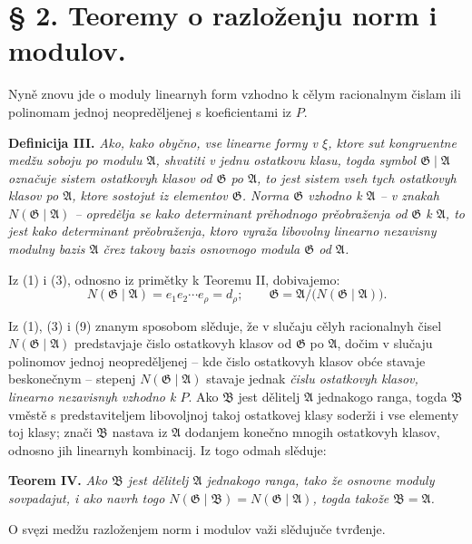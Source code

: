 \documentclass[11pt]{article}
\providecommand{\Amod}{\mathfrak A}
\providecommand{\Bmod}{\mathfrak B}
\providecommand{\Gmod}{\mathfrak G}
\providecommand{\Norm}{N}
\begin{document}
\section*{§ 2. Teoremy o razloženju norm i modulov.}

Nyně znovu jde o moduly linearnyh form vzhodno k cělym racionalnym čislam ili polinomam jednoj neopreděljenej s koeficientami iz $P$.

\medskip
\noindent\textbf{Definicija III.} \emph{Ako, kako obyčno, vse linearne formy v $\xi$, ktore sut kongruentne medžu soboju po modulu $\Amod$, shvatiti v jednu ostatkovu klasu, togda symbol $\Gmod\mid\Amod$ označuje sistem ostatkovyh klasov od $\Gmod$ po $\Amod$, to jest sistem vseh tych ostatkovyh klasov po $\Amod$, ktore sostojut iz elementov $\Gmod$. Norma $\Gmod$ vzhodno k $\Amod$ -- v znakah $\Norm(\Gmod\mid\Amod)$ -- opredělja se kako determinant prěhodnogo prěobraženja od $\Gmod$ k $\Amod$, to jest kako determinant prěobraženja, ktoro vyraža libovolny linearno nezavisny modulny bazis $\Amod$ črez takovy bazis osnovnogo modula $\Gmod$ od $\Amod$.}

Iz (1) i (3), odnosno iz primětky k Teoremu II, dobivajemo:
\begin{equation}
 \Norm(\Gmod\mid\Amod)=e_1e_2\cdots e_\rho=d_\rho;
 \qquad
 \Gmod=\Amod/\bigl(\Norm(\Gmod\mid\Amod)\bigr).
\tag{9}
\end{equation}

Iz (1), (3) i (9) znanym sposobom slěduje, že v slučaju cělyh racionalnyh čisel $\Norm(\Gmod\mid\Amod)$ predstavjaje čislo ostatkovyh klasov od $\Gmod$ po $\Amod$, dočim v slučaju polinomov jednoj neopreděljenej -- kde čislo ostatkovyh klasov obće stavaje beskonečnym -- stepenj $\Norm(\Gmod\mid\Amod)$ stavaje jednak \emph{čislu ostatkovyh klasov, linearno nezavisnyh vzhodno k $P$}. Ako $\Bmod$ jest dělitelj $\Amod$ jednakogo ranga, togda $\Bmod$ vměstě s predstaviteljem libovoljnoj takoj ostatkovej klasy soderži i vse elementy toj klasy; znači $\Bmod$ nastava iz $\Amod$ dodanjem konečno mnogih ostatkovyh klasov, odnosno jih linearnyh kombinacij. Iz togo odmah slěduje:

\medskip
\noindent\textbf{Teorem IV.} \emph{Ako $\Bmod$ jest dělitelj $\Amod$ jednakogo ranga, tako že osnovne moduly sovpadajut, i ako navrh togo $\Norm(\Gmod\mid\Bmod)=\Norm(\Gmod\mid\Amod)$, togda takože $\Bmod=\Amod$.}

O svęzi medžu razloženjem norm i modulov važi slědujuče tvrđenje.
\end{document}

